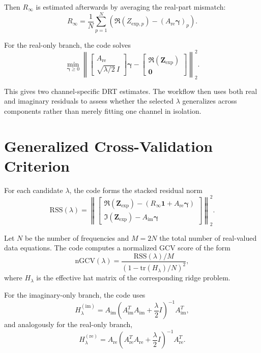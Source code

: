 \documentclass[11pt]{article}
\begin{document}
Then $R_{\infty}$ is estimated afterwards by averaging the real-part mismatch:
\begin{equation}
R_{\infty} = \frac{1}{N}\sum_{p=1}^N \left(\Re(Z_{\mathrm{exp},p}) - (A_{\mathrm{re}}\bm{\gamma})_p\right).
\end{equation}

For the real-only branch, the code solves
\begin{equation}
\min_{\bm{\gamma} \ge 0}
\left\|
\begin{bmatrix}
A_{\mathrm{re}} \\
\sqrt{\lambda/2}\,I
\end{bmatrix}
\bm{\gamma}
-
\begin{bmatrix}
\Re(\bm{Z}_{\mathrm{exp}}) \\
\bm{0}
\end{bmatrix}
\right\|_2^2.
\end{equation}

This gives two channel-specific DRT estimates. The workflow then uses both real and imaginary residuals to assess whether the selected $\lambda$ generalizes across components rather than merely fitting one channel in isolation.

\section{Generalized Cross-Validation Criterion}

For each candidate $\lambda$, the code forms the stacked residual norm
\begin{equation}
\mathrm{RSS}(\lambda) = \left\|
\begin{bmatrix}
\Re(\bm{Z}_{\mathrm{exp}}) - (R_{\infty}\bm{1} + A_{\mathrm{re}}\bm{\gamma}) \\
\Im(\bm{Z}_{\mathrm{exp}}) - A_{\mathrm{im}}\bm{\gamma}
\end{bmatrix}
\right\|_2^2.
\end{equation}

Let $N$ be the number of frequencies and $M = 2N$ the total number of real-valued data equations. The code computes a normalized GCV score of the form
\begin{equation}
\mathrm{nGCV}(\lambda) = \frac{\mathrm{RSS}(\lambda)/M}{\left(1 - \mathrm{tr}(H_\lambda)/N\right)^2},
\end{equation}
where $H_\lambda$ is the effective hat matrix of the corresponding ridge problem.

For the imaginary-only branch, the code uses
\begin{equation}
H_\lambda^{(\mathrm{im})} = A_{\mathrm{im}}\left(A_{\mathrm{im}}^T A_{\mathrm{im}} + \frac{\lambda}{2}I\right)^{-1}A_{\mathrm{im}}^T,
\end{equation}
and analogously for the real-only branch,
\begin{equation}
H_\lambda^{(\mathrm{re})} = A_{\mathrm{re}}\left(A_{\mathrm{re}}^T A_{\mathrm{re}} + \frac{\lambda}{2}I\right)^{-1}A_{\mathrm{re}}^T.
\end{equation}
\end{document}
